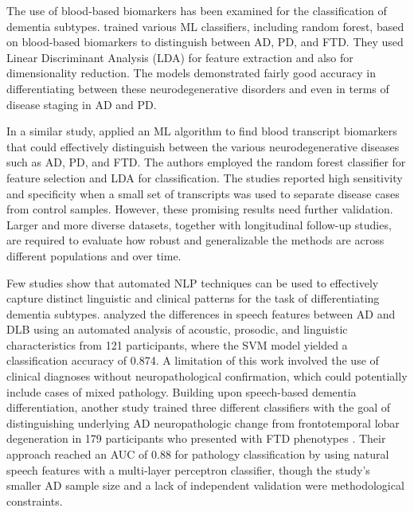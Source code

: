 The use of blood-based biomarkers has been examined for the classification of dementia subtypes.  trained various ML classifiers, including random forest, based on blood-based biomarkers to distinguish between AD, PD, and FTD. They used Linear Discriminant Analysis (\acrshort{LDA}) for feature extraction and also for dimensionality reduction. The models demonstrated fairly good accuracy in differentiating between these neurodegenerative disorders and even in terms of disease staging in AD and PD. 

In a similar study,  applied an ML algorithm to find blood transcript biomarkers that could effectively distinguish between the various neurodegenerative diseases such as AD, PD, and FTD. The authors employed the random forest classifier for feature selection and LDA for classification. The studies reported high sensitivity and specificity when a small set of transcripts was used to separate disease cases from control samples. However, these promising results need further validation. Larger and more diverse datasets, together with longitudinal follow-up studies, are required to evaluate how robust and generalizable the methods are across different populations and over time.

Few studies show that automated NLP techniques can be used to effectively capture distinct linguistic and clinical patterns for the task of differentiating dementia subtypes.  analyzed the differences in speech features between AD and DLB using an automated analysis of acoustic, prosodic, and linguistic characteristics from 121 participants, where the SVM model yielded a classification accuracy of 0.874. A limitation of this work involved the use of clinical diagnoses without neuropathological confirmation, which could potentially include cases of mixed pathology. Building upon speech-based dementia differentiation, another study trained three different classifiers with the goal of distinguishing underlying AD neuropathologic change from frontotemporal lobar degeneration in 179 participants who presented with FTD phenotypes \cite{Cho2024Automatic}. Their approach reached an AUC of 0.88 for pathology classification by using natural speech features with a multi‐layer perceptron classifier, though the study's smaller AD sample size and a lack of independent validation were methodological constraints.

